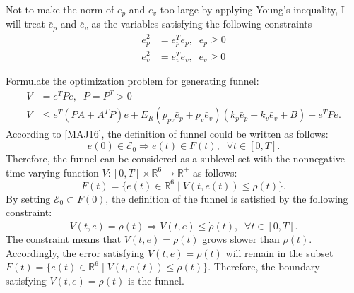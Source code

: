\documentclass{article}
\begin{document}
Not to make the norm of $e_p$ and $e_v$ too large by applying Young's inequality, I will treat $\bar{e}_p$ and $\bar{e}_v$ as the variables satisfying the following constraints
\begin{align}
\bar{e}_p^2 &= e_p^Te_p,\;\;\bar{e}_p \geq 0 \nonumber \\
\bar{e}_v^2 &= e_v^Te_v,\;\;\bar{e}_v \geq 0 \nonumber
\end{align}

Formulate the optimization problem for generating funnel:
\begin{align}
V &= e^TPe,\;\;P = P^T >0 \nonumber \\
\dot{V} &\leq e^T(PA + A^TP)e+ E_R(p_{pv}\bar{e}_p+p_v\bar{e}_v)(k_p\bar{e}_p+k_v\bar{e}_v+B)+e^T\dot{P}e. \nonumber
\end{align}
\newpage
According to [MAJ16], the definition of funnel could be written as follows:
\begin{equation}
e(0) \in \mathcal{E}_0 \Longrightarrow e(t) \in F(t),\;\; \forall t \in [0,T]. \nonumber
\end{equation}
Therefore, the funnel can be considered as a sublevel set with the nonnegative time varying function $V:[0,T]\times \mathbb{R}^6 \rightarrow \mathbb{R}^+$ as follows:
\begin{equation}
F(t) = \{e(t) \in \mathbb{R}^6\; |\; V(t,e(t)) \leq \rho(t)\}. \nonumber
\end{equation}
By setting $\mathcal{E}_0 \subset F(0)$, the definition of the funnel is satisfied by the following constraint:
\begin{equation}
V(t,e) = \rho(t) \Longrightarrow \dot{V}(t,e) \leq \dot{\rho}(t),\;\;\forall t \in [0,T]. \nonumber
\end{equation}
The constraint means that $V(t,e) = \rho(t)$ grows slower than $\rho(t)$. Accordingly, the error satisfying $V(t,e) = \rho(t)$ will remain in the subset $F(t) = \{e(t) \in \mathbb{R}^6\;|\;V(t,e(t)) \leq \rho(t)\}$. 
Therefore, the boundary satisfying $V(t,e) = \rho(t)$ is the funnel.
\end{document}
